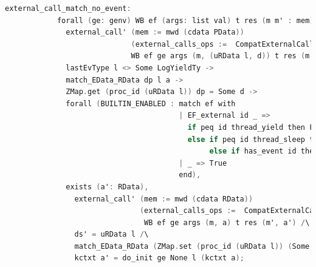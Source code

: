 \begin{lstlisting}[language=C]     
          external_call_match_no_event:
            forall (ge: genv) WB ef (args: list val) t res (m m' : mem) l d d' ds' (dp : EData) (a: RData),
              external_call' (mem := mwd (cdata PData)) 
                             (external_calls_ops :=  CompatExternalCalls.compatlayer_extcall_ops (LH <@$\oplus$@> L64))
                             WB ef ge args (m, (uRData l, d)) t res (m', (ds', d')) ->
              lastEvType l <> Some LogYieldTy ->
              match_EData_RData dp l a ->
              ZMap.get (proc_id (uRData l)) dp = Some d ->
              forall (BUILTIN_ENABLED : match ef with
                                        | EF_external id _ => 
                                          if peq id thread_yield then False
                                          else if peq id thread_sleep then False
                                               else if has_event id then False else True
                                        | _ => True
                                        end),
              exists (a': RData),
                external_call' (mem := mwd (cdata RData)) 
                               (external_calls_ops :=  CompatExternalCalls.compatlayer_extcall_ops (pbthread  <@$\oplus$@>  L64))
                                WB ef ge args (m, a) t res (m', a') /\
                ds' = uRData l /\
                match_EData_RData (ZMap.set (proc_id (uRData l)) (Some d') dp) l a' /\
                kctxt a' = do_init ge None l (kctxt a);
\end{lstlisting}
         
